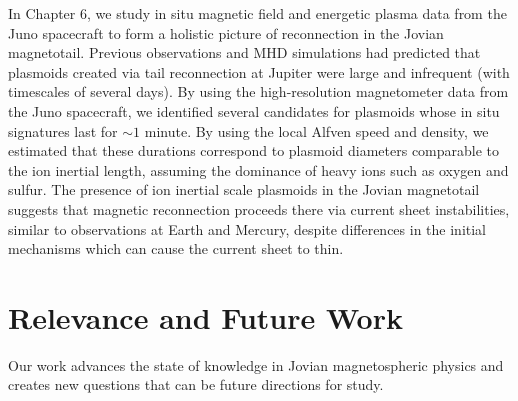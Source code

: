 In Chapter 6, we study in situ magnetic field and energetic plasma data from the Juno spacecraft to form a holistic picture of reconnection in the Jovian magnetotail. Previous observations and MHD simulations had predicted that plasmoids created via tail reconnection at Jupiter were large and infrequent (with timescales of several days). By using the high-resolution magnetometer data from the Juno spacecraft, we identified several candidates for plasmoids whose in situ signatures last for $\sim1$ minute. By using the local Alfven speed and density, we estimated that these durations correspond to plasmoid diameters comparable to the ion inertial length, assuming the dominance of heavy ions such as oxygen and sulfur. The presence of ion inertial scale plasmoids in the Jovian magnetotail suggests that magnetic reconnection proceeds there via current sheet instabilities, similar to observations at Earth and Mercury, despite differences in the initial mechanisms which can cause the current sheet to thin. 

\section{Relevance and Future Work}
Our work advances the state of knowledge in Jovian magnetospheric physics and creates new questions that can be future directions for study. 

